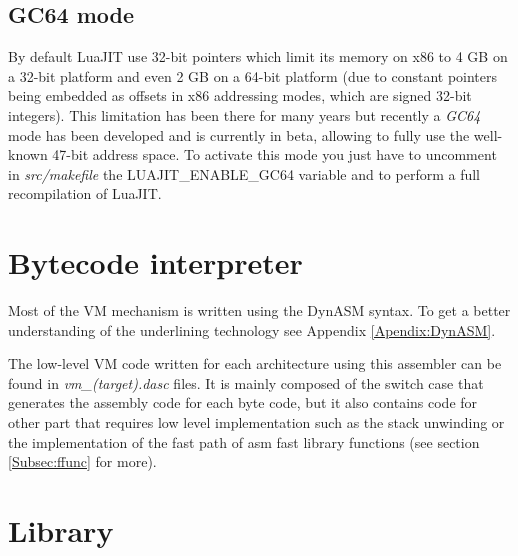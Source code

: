 
\subsection{GC64 mode}
\label{Subsec:gc64}

By default LuaJIT use 32-bit pointers which limit its memory on x86 to 4 GB on a
32-bit platform and even 2 GB on a 64-bit platform (due to constant pointers being
embedded as offsets in x86 addressing modes, which are signed 32-bit integers).
This limitation has been there for many years but recently a \emph{GC64} mode
has been developed and is currently in beta, allowing to fully use the well-known
47-bit address space. To activate this mode you just have to uncomment in
\emph{src/makefile} the LUAJIT\_ENABLE\_GC64 variable and to perform a full
recompilation of LuaJIT.



\section{Bytecode interpreter}
\label{Sec:BI}

Most of the VM mechanism is written using the DynASM syntax. To get a better
understanding of the underlining technology see Appendix \ref{Apendix:DynASM}.

The low-level VM code written for each architecture using this assembler can be
found in \emph{vm\_(target).dasc} files. It is mainly composed of the switch
case that generates the assembly code for each byte code, but it also contains
code for other part that requires low level implementation such as the
stack unwinding or the implementation of the fast path of asm fast library functions
(see section \ref{Subsec:ffunc} for more).



\section{Library}
\label{Sec:Library}
    
